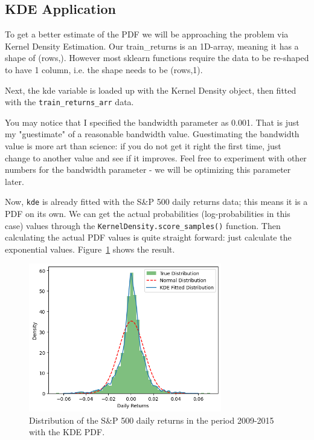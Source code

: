 \subsection{KDE Application}

To get a better estimate of the PDF we will be approaching the problem via Kernel Density Estimation. 
Our train\_returns is an 1D-array, meaning it has a shape of (rows,). However most sklearn functions require the data to be re-shaped to have 1 column, i.e. the shape needs to be (rows,1).

Next, the kde variable is loaded up with the Kernel Density object, then fitted with the \texttt{train\_returns\_arr} data.

You may notice that I specified the bandwidth parameter as 0.001. That is just my "guestimate" of a reasonable bandwidth value. Guestimating the bandwidth value is more art than science: if you do not get it right the first time, just change to another value and see if it improves. Feel free to experiment with other numbers for the bandwidth parameter - we will be optimizing this parameter later.

Now, \texttt{kde} is already fitted with the S\&P 500 daily returns data; this means it is a PDF on its own.
We can get the actual probabilities (log-probabilities in this case) values through the \texttt{KernelDensity.score\_samples()} function. Then calculating the actual PDF values is quite straight forward: just calculate the exponential values. Figure~\ref{fig:kde_kde_spy} shows the result.


\begin{figure}[htb]
\centering
\includegraphics[width=0.75\textwidth]{figures/kde_kde_spy}
\caption{Distribution of the S\&P 500 daily returns in the period 2009-2015 with the KDE PDF.}
\label{fig:kde_kde_spy}
\end{figure}


